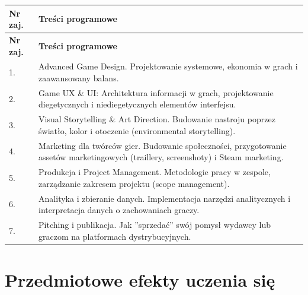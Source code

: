 \documentclass[12pt, a4paper]{article}
\newcommand{\thdrule}{\noalign{\global\setlength{\extrarowheight}{0pt}}}
\newcommand{\thdend}{\noalign{\global\setlength{\extrarowheight}{3pt}}}
\begin{document}
{\scriptsize
\begin{longtable}{m{1.5cm}m{14.5cm}}
\thdrule\toprule
\rowcolor{pjatkRed} {\color{white}\textbf{Nr zaj.}} & {\color{white}\textbf{Treści programowe}} \\
\midrule\thdend
\endfirsthead
\thdrule\toprule
\rowcolor{pjatkRed} {\color{white}\textbf{Nr zaj.}} & {\color{white}\textbf{Treści programowe}} \\
\midrule\thdend
\endhead
  \rowcolor{tableRowLight} 1. & Advanced Game Design. Projektowanie systemowe, ekonomia w grach i zaawansowany balans. \\
  \rowcolor{tableRowAlt} 2. & Game UX \& UI: Architektura informacji w grach, projektowanie diegetycznych i niediegetycznych elementów interfejsu. \\
  \rowcolor{tableRowLight} 3. & Visual Storytelling \& Art Direction. Budowanie nastroju poprzez światło, kolor i otoczenie (environmental storytelling). \\
  \rowcolor{tableRowAlt} 4. & Marketing dla twórców gier. Budowanie społeczności, przygotowanie assetów marketingowych (traillery, screenshoty) i Steam marketing. \\
  \rowcolor{tableRowLight} 5. & Produkcja i Project Management. Metodologie pracy w zespole, zarządzanie zakresem projektu (scope management). \\
  \rowcolor{tableRowAlt} 6. & Analityka i zbieranie danych. Implementacja narzędzi analitycznych i interpretacja danych o zachowaniach graczy. \\
  \rowcolor{tableRowLight} 7. & Pitching i publikacja. Jak ''sprzedać'' swój pomysł wydawcy lub graczom na platformach dystrybucyjnych. \\
\bottomrule
\end{longtable}}

\section{Przedmiotowe efekty uczenia się}
\end{document}
